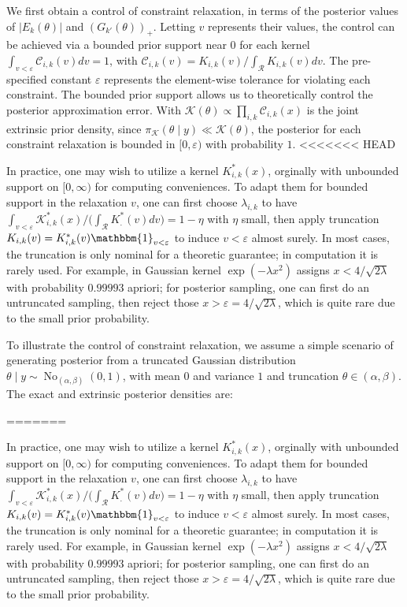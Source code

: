 \documentclass[10pt]{article}
\newcommand{\mc}[1]{\mathcal{#1}}
\DeclareMathOperator{\No}{No}
\DeclareMathOperator{\1}{\mathbbm{1}}
\begin{document}
We first obtain a control of constraint relaxation, in terms of the posterior values of $|E_k(\theta)|$ and $(G_{k'}(\theta))_+$. Letting $v$ represents their values, the control can be achieved via a bounded prior support near $0$ for each kernel $\int_{v<\varepsilon} \mc C_{i,k}(v)  dv= 1$, with  $\mc C_{i,k}(v) = K_{i,k}(v) / \int_{\mc R}K_{i,k}(v) dv$. The pre-specified constant $\varepsilon$ represents the element-wise tolerance for violating each constraint. The bounded prior support allows us to theoretically control the posterior approximation error. With $\mc K(\theta) \propto \prod_{i,k} \mc C_{i,k}(x)$ is the joint extrinsic prior density, since $\pi_{\mc K}(\theta \mid y) \ll \mc K(\theta)$, the posterior for each constraint relaxation is bounded in $[0,\varepsilon)$ with probability $1$.
<<<<<<< HEAD

In practice, one may wish to utilize a kernel $K^*_{i,k}(x)$, orginally with unbounded support on $[0,\infty)$ for computing conveniences. To adapt them for bounded support in the relaxation $v$, one can first choose $\lambda_{i,k}$ to have $\int_{v<\varepsilon} \mc K^*_{i,k}(x)/ \big( \int_{\mc R} K^*_{.}(v) dv\big ) = 1-\eta$ with $\eta$ small, then apply truncation $K_{i,k}(v)= K^*_{i,k}(v) \mathbbm{1}_{v<\varepsilon}$ to induce $v<\varepsilon$ almost surely. In most cases, the truncation is only nominal for a theoretic guarantee; in computation it is rarely used. For example, in Gaussian kernel $\exp( -{\lambda x^2})$ assigns $x<4/\sqrt{2\lambda}$ with probability $0.99993$ apriori; for posterior sampling, one can first do an untruncated sampling, then reject those $x>\varepsilon=4/\sqrt{2\lambda}$, which is quite rare due to the small prior probability. 

To illustrate the control of constraint relaxation, we assume a simple scenario of generating posterior from a truncated Gaussian distribution $\theta \mid y \sim \No_{(\alpha,\beta)}(0,1)$, with mean $0$ and variance $1$ and truncation $\theta\in (\alpha,\beta)$. The exact and extrinsic posterior densities are:

=======

In practice, one may wish to utilize a kernel $K^*_{i,k}(x)$, orginally with unbounded support on $[0,\infty)$ for computing conveniences. To adapt them for bounded support in the relaxation $v$, one can first choose $\lambda_{i,k}$ to have $\int_{v<\varepsilon} \mc K^*_{i,k}(x)/ \big( \int_{\mc R} K^*_{.}(v) dv\big ) = 1-\eta$ with $\eta$ small, then apply truncation $K_{i,k}(v)= K^*_{i,k}(v) \mathbbm{1}_{v<\varepsilon}$ to induce $v<\varepsilon$ almost surely. In most cases, the truncation is only nominal for a theoretic guarantee; in computation it is rarely used. For example, in Gaussian kernel $\exp( -{\lambda x^2})$ assigns $x<4/\sqrt{2\lambda}$ with probability $0.99993$ apriori; for posterior sampling, one can first do an untruncated sampling, then reject those $x>\varepsilon=4/\sqrt{2\lambda}$, which is quite rare due to the small prior probability. 
\end{document}
